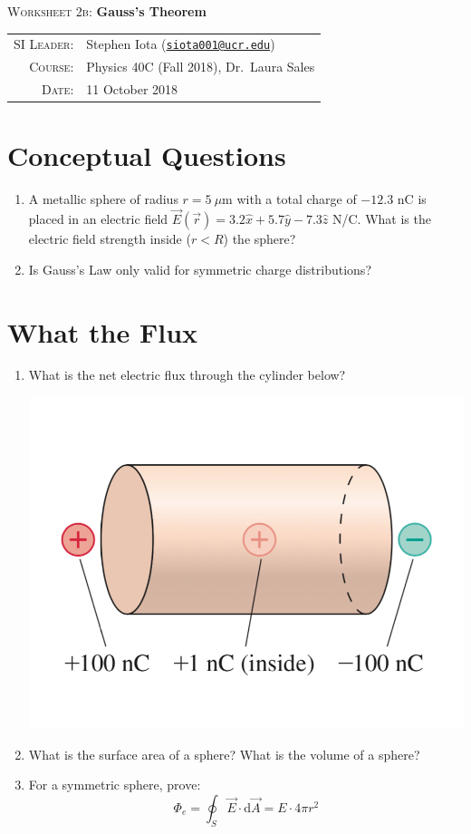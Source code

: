 \documentclass[11pt]{article}
\newcommand{\email}[1]{\texttt{\href{mailto:#1}{#1}}}
\begin{document}
\begin{center}

\Large{\textsc{Worksheet 2b}: \textbf{Gauss's Theorem}}

\end{center}

\vspace{.5mm}


\begin{tabular}{rl}
\textsc{SI Leader}:
&
Stephen Iota (\email{siota001@ucr.edu})
\\
\textsc{Course}:
&
Physics 40C (Fall 2018), Dr.~Laura Sales
\\
\textsc{Date}:
&
11 October 2018
\end{tabular}



\section{Conceptual Questions}

\begin{enumerate}[label=(\alph*)]

\item A metallic sphere of radius $r = 5 \ \mu$m with a total charge of $-12.3$ nC is placed in an electric field $\vec{E}(\vec{r}) = 3.2 \hat{x} + 5.7 \hat{y}  - 7.3 \hat{z}$ N/C. What is the electric field strength inside ($r<R$) the sphere?
\item Is Gauss's Law only valid for symmetric charge distributions?  	

\end{enumerate}

 
\section{What the Flux}

\begin{enumerate}[label=(\alph*)]

\item What is the net electric flux through the cylinder below?
\begin{center}
\includegraphics[width=.3\linewidth]{W2b_fig2}
\end{center}
\item What is the surface area of a sphere? What is the volume of a sphere?

\item For a symmetric sphere, prove:
$$\Phi_{e} = \oint_{S} \vec{E} \cdot \mathrm{d}\vec{A} = E\cdot4\pi r^2$$ 
	
\end{enumerate}
\end{document}
